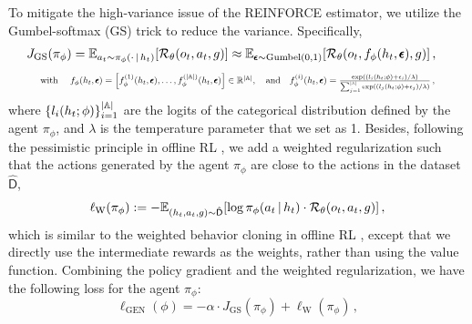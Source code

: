 To mitigate the high-variance issue of the REINFORCE estimator, we utilize the Gumbel-softmax (GS) trick \citep{jang2016categorical,maddison2016concrete, fan2021contextual} to reduce the variance. 
Specifically,
\begin{align}\textstyle
J_{\tiny{\mathrm{GS}}}(\pi_{\phi}) &= \E_{a_t \sim  \pi_\phi(\cdot \given h_t)}[\gR_{\theta}(o_t, a_t, g)]
\notag \approx \E_{\pmb{\epsilon} \sim \mathrm{Gumbel}(0, 1)}[\gR_{\theta}(o_t,f_{\phi}(h_t, \pmb{\epsilon}) , g)]\,, \label{equ:gs_estimator}
\end{align} 
\begin{equation*}
\resizebox{.90\linewidth}{!}{%
$
  \text{with}~~~~ f_{\phi}(h_t, \pmb{\epsilon})= \sbr{f_{\phi}^{(1)}(h_t, \pmb{\epsilon}), \ldots, f_{\phi}^{(|\sA|)}(h_t, \pmb{\epsilon})} \in \mathbb{R}^{|\sA|},~~~\text{and}~~~f_{\phi}^{(i)}(h_t, \pmb{\epsilon}) = \frac{\exp((l_i(h_t; \phi) + \epsilon_i) / \lambda)}{\sum_{j=1}^{|\sA|} \exp((l_j(h_t; \phi) + \epsilon_j) / \lambda)}\,,
    $%
}
\end{equation*}
where $\{l_{i}(h_t; \phi)\}_{i=1}^{|{\mathbb{A}}|}$ are the logits of the categorical distribution defined by the agent $\pi_{\phi}$, and $\lambda$ is the temperature parameter that we set as 1.
Besides, following the pessimistic principle in offline RL \citep{buckman2020importance}, 
we add a weighted regularization such that the actions generated by the agent $\pi_{\phi}$ are close to the actions in the dataset $\hat{\mathsf{D}}$,
\begin{align*}\textstyle
\ell_\mathrm{W}(\pi_{\phi}) := - \mathbb{E}_{(h_t, a_t,  g) \sim \hat{\mathsf{D}}}[\log \pi_{\phi}(a_t \,|\,  h_t) \cdot {\mathcal{R}}_\theta( o_t, a_t, g)] \,,
\end{align*}
which is similar to the weighted behavior cloning in offline RL \citep{wang2020critic}, except that we directly use the intermediate rewards as the weights, rather than using the value function.
Combining the policy gradient and the weighted regularization, we have the following loss for the agent $\pi_{\phi}$:
\begin{equation}\label{eq:loss_gen} \textstyle
    \ell_{\mathrm{GEN}}(\phi) = -\alpha \cdot J_{\mathrm{GS}}(\pi_{\phi}) +  \ell_\mathrm{W}(\pi_{\phi}) \,,
\end{equation}
